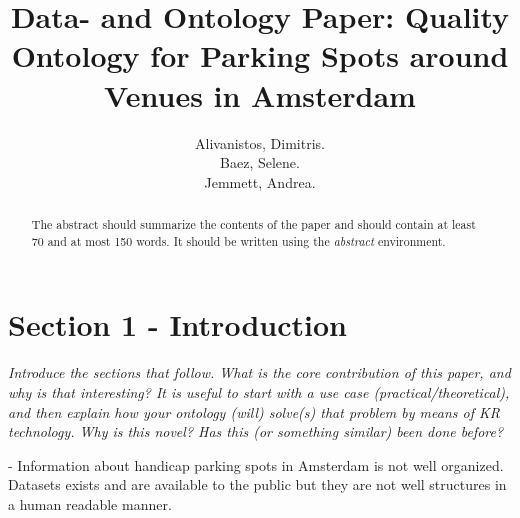 \documentclass[runningheads,a4paper]{../../StyleFiles/llncs}
\begin{document}
\mainmatter  %

\title{Data- and Ontology Paper: Quality Ontology for Parking Spots around Venues in Amsterdam}


%
%
\author{Alivanistos, Dimitris. \\ Baez, Selene. \\ Jemmett, Andrea. }
%


\maketitle


\begin{abstract}
The abstract should summarize the contents of the paper and should
contain at least 70 and at most 150 words. It should be written using the
\emph{abstract} environment.
\end{abstract}


\section{Section 1 - Introduction}
\textit{Introduce the sections that follow. What is the core contribution of this paper, and why is that interesting? It is useful to start with a use case (practical/theoretical), and then explain how your ontology (will) solve(s) that problem by means of KR technology. Why is this novel? Has this (or something similar) been done before?}

- Information about handicap parking spots in Amsterdam is not well organized. Datasets exists and are available to the public but they are not well structures in a human readable manner. 
\end{document}
